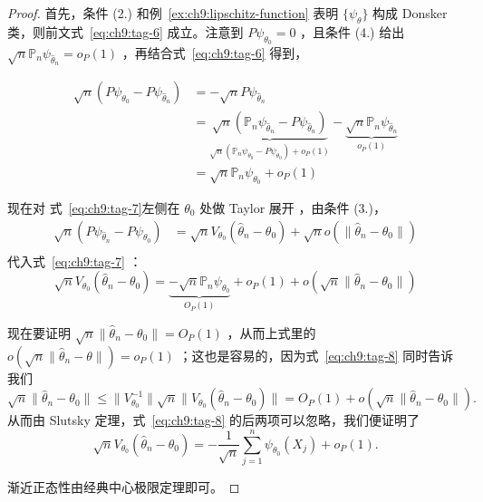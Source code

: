 \begin{proof}

首先，条件 (2.) 和例~\ref{ex:ch9:lipschitz-function} 表明 $\{\psi_\theta\}$ 构成 Donsker 类，则前文式~\eqref{eq:ch9:tag-6} 成立。注意到 $P\psi_{\theta_0}=0$ ，且条件 (4.) 给出 $\sqrt{n}\mathbb{P}_n\psi_{\widehat{\theta}_n} = o_P(1)$ ，再结合式~\eqref{eq:ch9:tag-6} 得到，

\begin{equation}
\label{eq:ch9:tag-7}
\begin{aligned} \sqrt{n}(P\psi_{\theta_0} - P\psi_{\widehat{\theta}_n}) &= -\sqrt{n}P\psi_{\widehat{\theta}_n} \\ &= \underbrace{\sqrt{n}(\mathbb{P}_n\psi_{\widehat{\theta}_n} - P\psi_{\widehat{\theta}_n})}_{\sqrt{n}(\mathbb{P}_n\psi_{\theta_0} - P\psi_{\theta_0}) + o_P(1)} - \underbrace{\sqrt{n}\mathbb{P}_n\psi_{\widehat{\theta}_n} }_{o_P(1)}\\  &= \sqrt n\mathbb P_n\psi_{\theta_0} + o_P(1)  \end{aligned}
\end{equation}

现在对 式~\eqref{eq:ch9:tag-7}左侧在 $\theta_0$ 处做 Taylor 展开 ，由条件 (3.)，\[\begin{aligned} \sqrt n(P\psi_{\widehat\theta_n} -  P\psi_{\theta_0}) &= \sqrt nV_{\theta_0}(\widehat\theta_n-\theta_0) + \sqrt no(\|\widehat\theta_n-\theta_0\|)\\  \end{aligned}\]
代入式~\eqref{eq:ch9:tag-7} ：
\begin{equation}
\label{eq:ch9:tag-8}
\sqrt{n}V_{\theta_0}(\widehat{\theta}_n - \theta_0) =\underbrace{-\sqrt n\mathbb P_n \psi_{\theta_0}}_{O_P(1)} + o_P(1)+o(\sqrt{n}\|\widehat{\theta}_n - \theta_0\|)
\end{equation}

现在要证明 $\sqrt{n}\|\widehat{\theta}_n - \theta_0\| = O_P(1)$ ，从而上式里的 $o(\sqrt n\|\widehat\theta_n-\theta\|)=o_P(1)$ ；这也是容易的，因为式~\eqref{eq:ch9:tag-8} 同时告诉我们
\[
\sqrt{n}\|\widehat{\theta}_n - \theta_0\| \le \|V_{\theta_0}^{-1}\|\sqrt n\|V_{\theta_0}(\widehat{\theta}_n - \theta_0)\|=O_P(1)+o(\sqrt{n}\|\widehat{\theta}_n - \theta_0\|).
\]
从而由 Slutsky 定理，式~\eqref{eq:ch9:tag-8} 的后两项可以忽略，我们便证明了
\[
\sqrt{n}V_{\theta_0}(\widehat{\theta}_n - \theta_0) = -\frac{1}{\sqrt{n}}\sum_{j=1}^n \psi_{\theta_0}(X_j) + o_P(1).
\]

渐近正态性由经典中心极限定理即可。

\end{proof}

